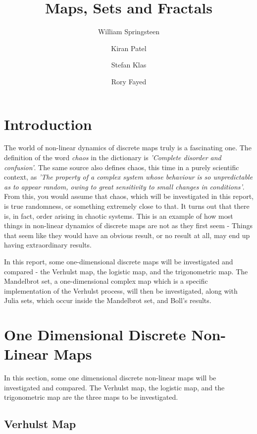 \documentclass[a4wide, 10pt]{article}
\begin{document}
\title{Maps, Sets and Fractals}

\author{William Springsteen \and Kiran Patel \and Stefan Klas \and Rory Fayed}

\maketitle

\section{Introduction}

The world of non-linear dynamics of discrete maps truly is a fascinating one. The
 definition of the word \emph{chaos} in the dictionary is \emph{'Complete disorder
  and confusion'}\cite{Chaos in Dictionary}. The same source also defines chaos, 
   this time in a purely scientific context, as \emph{'The property of a complex 
    system whose behaviour is so unpredictable as to appear random, owing to great 
     sensitivity to small changes in conditions'}. From this, you would assume that
      chaos, which will be investigated in this report, is true randomness, or something
       extremely close to that. It turns out that there is, in fact, order arising in 
        chaotic systems. This is an example of how most things in non-linear dynamics of
         discrete maps are not as they first seem - Things that seem like they
          would have an obvious result, or no result at all, may end up having
           extraordinary results.

In this report, some one-dimensional discrete maps will be investigated and compared - the Verhulst map, the logistic map, and the trigonometric map. The Mandelbrot set, a one-dimensional complex map which is a specific 
    implementation of the Verhulst process, will then be  investigated, along with 
     Julia sets, which occur inside the Mandelbrot set, and Boll's results.

\section{One Dimensional Discrete Non-Linear Maps}

In this section, some one dimensional discrete non-linear maps will be investigated
 and compared. The Verhulst map, the logistic map, and the trigonometric map are the three maps to be investigated.

\subsection{Verhulst Map}
\end{document}
